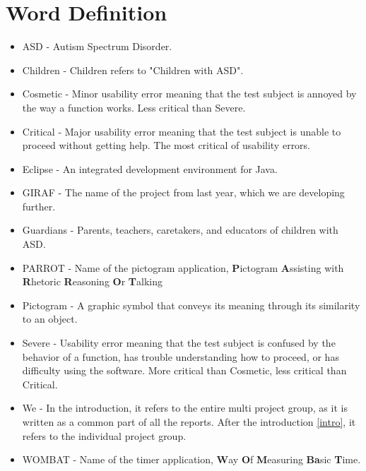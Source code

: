 \chapter*{Word Definition}

\begin{itemize}

	\item ASD - Autism Spectrum Disorder.
	
	\item Children - Children refers to "Children with ASD".
	\item Cosmetic - Minor usability error meaning that the test subject is annoyed by the way a function works. Less critical than Severe. 
	\item Critical - Major usability error meaning that the test subject is unable to proceed without getting help. The most critical of usability errors.
	\item Eclipse - An integrated development environment for Java.
	\item GIRAF - The name of the project from last year, which we are developing further.
	\item Guardians - Parents, teachers, caretakers, and educators of children with ASD.
	\item PARROT - Name of the pictogram application, \textbf{P}ictogram \textbf{A}ssisting with \textbf{R}hetoric \textbf{R}easoning \textbf{O}r \textbf{T}alking
	\item Pictogram - A graphic symbol that conveys its meaning through its similarity to an object.
	\item Severe - Usability error meaning that the test subject is confused by the behavior of a function, has trouble understanding how to proceed, or has difficulty using the software. More critical than Cosmetic, less critical than Critical.
	\item We - In the introduction, it refers to the entire multi project group, as it is written as a common part of all the reports. After the introduction \autoref{intro}, it refers to the individual project group.
	\item WOMBAT - Name of the timer application, \textbf{W}ay \textbf{O}f \textbf{M}easuring \textbf{Ba}sic \textbf{T}ime.

\end{itemize}